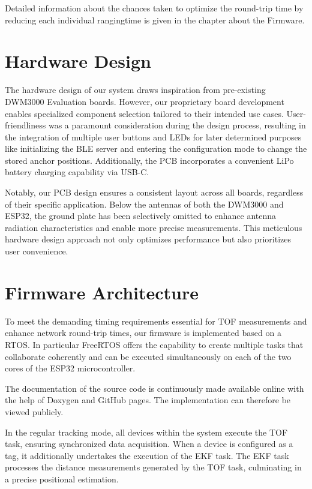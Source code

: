 \documentclass[conference, a4paper]{IEEEtran}
\begin{document}
Detailed information about the chances taken to optimize the round-trip time by reducing each individual rangingtime
is given in the chapter about the Firmware.


\section{Hardware Design}\label{section:hardware}
The hardware design of our system draws inspiration from pre-existing DWM3000 Evaluation
boards.
However, our proprietary board development enables specialized component selection
tailored to their intended use cases.
User-friendliness was a paramount consideration during the design process,
resulting in the integration of multiple user buttons and LEDs for later determined purposes like initializing the \ac{BLE} server and entering the configuration mode to change the stored anchor positions.
Additionally, the PCB incorporates a convenient LiPo battery charging capability
via USB-C.

Notably, our PCB design ensures a consistent layout across all boards,
regardless of their specific application.
Below the antennas of both the DWM3000 and ESP32,
the ground plate has been selectively omitted to enhance antenna radiation
characteristics and enable more precise measurements.
This meticulous hardware design approach not only optimizes
performance but also prioritizes user convenience. 


\section{Firmware Architecture}\label{section:firmware}
To meet the demanding timing requirements essential for \ac{TOF}
measurements and enhance network round-trip times,
our firmware is implemented based on a \ac{RTOS}.
In particular FreeRTOS \cite{FreeRTOS_2023} offers the capability to create multiple tasks that collaborate coherently and can be executed simultaneously on each of the two cores of the ESP32 microcontroller.

The documentation of the source code is continuously made available online with the help of Doxygen and GitHub pages.
The implementation can therefore be viewed publicly\cite{doxygen-doku}.

In the regular tracking mode,
all devices within the system execute the TOF task, ensuring synchronized data acquisition.
When a device is configured as a tag,
it additionally undertakes the execution of the \ac{EKF} task.
The \ac{EKF} task processes the distance measurements generated by the TOF task,
culminating in a precise positional estimation.
\end{document}
